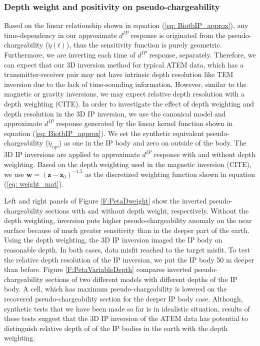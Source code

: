 \documentclass[a4paper, 11pt]{article}
\newcommand{\peta}{\tilde{\eta}}
\newcommand{\dip}{d^{IP}}
\begin{document}
\subsubsection{Depth weight and positivity on pseudo-chargeability}
Based on the linear relationship shown in equation (\ref{eq: BiotbIP_approx}), any time-dependency in our approximate $\dip$ response is originated from the pseudo-chargeability ($\peta(t)$), thus the sensitivity function is purely geometric. Furthermore, we are inverting each time of $\dip$ response, separately. Therefore, we can expect that our 3D inversion method for typical ATEM data, which has a transmitter-receiver pair may not have intrinsic depth resolution like TEM inversion due to the lack of time-sounding information. However, similar to the magnetic or gravity inversions, we may expect relative depth resolution with a depth weighting (CITE). In order to investigate the effect of depth weighting and depth resolution in the 3D IP inversion, we use the canonical model and approximate $\dip$ response generated by the linear kernel function shown in equation (\ref{eq: BiotbIP_approx}). We set the synthetic equivalent pseudo-chargeability ($\peta_{eqv}$) as one in the IP body and zero on outside of the body. The 3D IP inversions are applied to approximate $\dip$ response with and without depth weighting. Based on the depth weighting used in the magnetic inversion (CITE), we use $\mathbf{w} = (\mathbf{z}-\mathbf{z}_0)^{-1.5}$ as the discretized weighting function shown in equation (\ref{eq: weight_mat}). 

Left and right panels of Figure \ref{F:PetaDweight} show the inverted pseudo-chargeability sections with and without depth weight, respectively. Without the depth weighting, inversion puts higher pseudo-chargeability anomaly on the near surface because of much greater sensitivity than in the deeper part of the earth. Using the depth weighting, the 3D IP inversion imaged the IP body on reasonable depth. In both cases, data misfit reached to the target misfit. To test the relative depth resolution of the IP inversion, we put the IP body 50 m deeper than before. Figure \ref{F:PetaVariableDepth} compares inverted pseudo-chargeability sections of two different models with different depths of the IP body. A cell, which has maximum pseudo-chargeability is lowered on the recovered pseudo-chargeability section for the deeper IP body case. Although, synthetic tests that we have been made so far is in idealistic situation, results of these tests suggest that the 3D IP inversion of the ATEM data has potential to distinguish relative depth of of the IP bodies in the earth with the depth weighting. 
\end{document}
